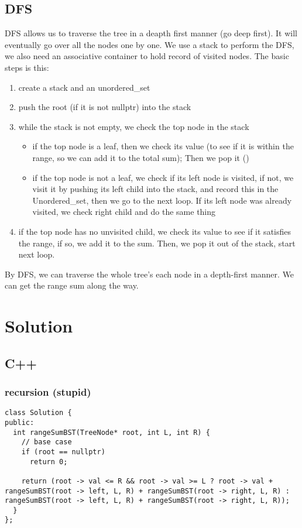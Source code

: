 \documentclass[12pt]{book}
\begin{document}
\subsection{DFS}
\label{sec:orga054ba0}
DFS allows us to traverse the tree in a deapth first manner (go deep first). It will eventually go over all the nodes one by one. We use a stack to perform the DFS, we also need an associative container to hold record of visited nodes. The basic steps is this:
\begin{enumerate}
\item create a stack and an unordered\_set
\item push the root (if it is not nullptr) into the stack
\item while the stack is not empty, we check the top node in the stack
\begin{itemize}
\item if the top node is a leaf, then we check its value (to see if it is within the range, so we can add it to the total sum); Then we pop it ()
\item if the top node is not a leaf, we check if its left node is visited, if not, we visit it by pushing its left child into the stack, and record this in the Unordered\_set, then we go to the next loop. If its left node was already visited, we check right child and do the same thing
\end{itemize}
\item if the top node has no unvisited child, we check its value to see if it satisfies the range, if so, we add it to the sum. Then, we pop it out of the stack, start next loop.
\end{enumerate}

By DFS, we can traverse the whole tree's each node in a depth-first manner. We can get the range sum along the way.

\section{Solution}
\label{sec:org3de7526}

\subsection{C++}
\label{sec:org8ce3785}

\subsubsection{recursion (stupid)}
\label{sec:org82253e9}
\begin{verbatim}
class Solution {
public:
  int rangeSumBST(TreeNode* root, int L, int R) {
    // base case 
    if (root == nullptr)
      return 0;

    return (root -> val <= R && root -> val >= L ? root -> val + rangeSumBST(root -> left, L, R) + rangeSumBST(root -> right, L, R) : rangeSumBST(root -> left, L, R) + rangeSumBST(root -> right, L, R));
  }
};
\end{verbatim}
\end{document}
